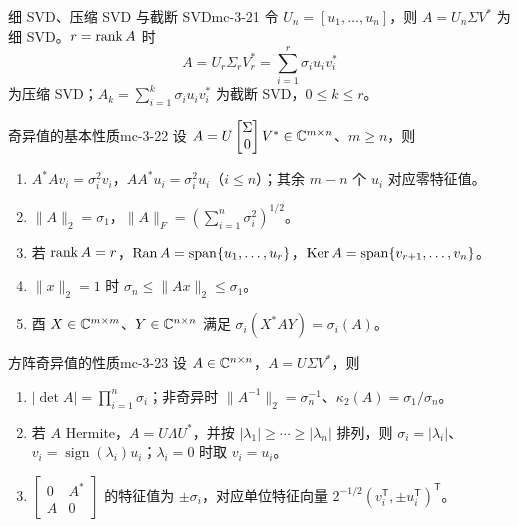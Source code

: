 \begin{definition}{细 SVD、压缩 SVD 与截断 SVD}{mc-3-21}
令 $U_n=[u_1,\ldots,u_n]$，则 $A=U_n\Sigma V^*$ 为细 SVD。$r=\operatorname{rank} A$ 时
\[A=U_r\Sigma_rV_r^*=\sum_{i=1}^r\sigma_iu_iv_i^*\]
为压缩 SVD；$A_k=\sum_{i=1}^k\sigma_iu_iv_i^*$ 为截断 SVD，$0\leq k\leq r$。
\end{definition}

\begin{theorem}{奇异值的基本性质}{mc-3-22}
设 $A=U\begin{bmatrix}\Sigma\\0\end{bmatrix}V^*\in\mathbb{C}^{m\times n}$、$m\geq n$，则
\begin{enumerate}
\item $A^*Av_i=\sigma_i^2v_i$，$AA^*u_i=\sigma_i^2u_i$（$i\leq n$）；其余 $m-n$ 个 $u_i$ 对应零特征值。
\item $\|A\|_2=\sigma_1$，$\|A\|_F=(\sum_{i=1}^n\sigma_i^2)^{1/2}$。
\item 若 $\operatorname{rank} A=r$，$\operatorname{Ran} A=\operatorname{span}\{u_1,\ldots,u_r\}$，$\operatorname{Ker} A=\operatorname{span}\{v_{r+1},\ldots,v_n\}$。
\item $\|x\|_2=1$ 时 $\sigma_n\leq\|Ax\|_2\leq\sigma_1$。
\item 酉 $X\in\mathbb{C}^{m\times m}$、$Y\in\mathbb{C}^{n\times n}$ 满足 $\sigma_i(X^*AY)=\sigma_i(A)$。
\end{enumerate}
\end{theorem}

\begin{theorem}{方阵奇异值的性质}{mc-3-23}
设 $A\in\mathbb{C}^{n\times n}$，$A=U\Sigma V^*$，则
\begin{enumerate}
\item $|\det A|=\prod_{i=1}^n\sigma_i$；非奇异时 $\|A^{-1}\|_2=\sigma_n^{-1}$、$\kappa_2(A)=\sigma_1/\sigma_n$。
\item 若 $A$ Hermite，$A=U\Lambda U^*$，并按 $|\lambda_1|\geq\cdots\geq|\lambda_n|$ 排列，则 $\sigma_i=|\lambda_i|$、$v_i=\operatorname{sign}(\lambda_i)u_i$；$\lambda_i=0$ 时取 $v_i=u_i$。
\item $\begin{bmatrix}0&A^*\\A&0\end{bmatrix}$ 的特征值为 $\pm\sigma_i$，对应单位特征向量 $2^{-1/2}(v_i^{\mathsf T},\pm u_i^{\mathsf T})^{\mathsf T}$。
\end{enumerate}
\end{theorem}


